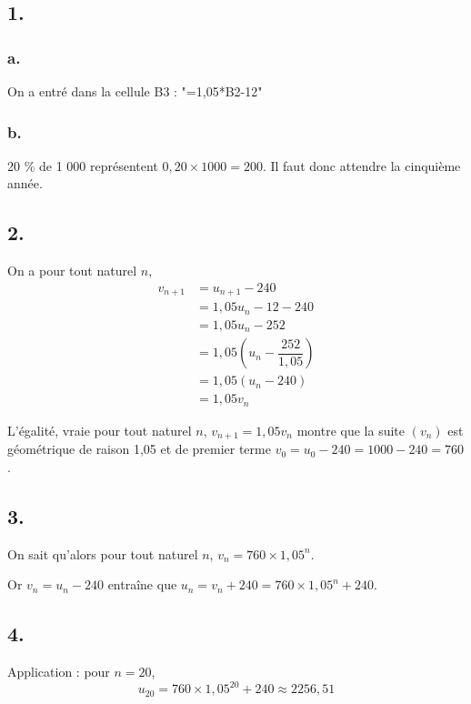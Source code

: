 \subsection*{1.}
	
	\subsubsection*{a.}
	
	On a entré dans la cellule B3 : "=1,05*B2-12"
	
	\subsubsection*{b.}
	
	20 \% de 1 000 représentent \(0,20 \times 1000 = 200\). Il faut donc attendre la cinquième année.
	

	\subsection*{2.}
	
	On a pour tout naturel \(n\),
\begin{align*}
			v_{n+1}& = u_{n+1} - 240\\
			& = 1,05u_n - 12 - 240 \\
			&= 1,05u_n - 252 \\
			&= 1,05(u_n - \dfrac{252}{1,05}) \\
			&= 1,05(u_n - 240) \\
			&= 1,05v_n
\end{align*}

	
	
	L'égalité, vraie pour tout naturel \(n\), \(v_{n+1} = 1,05v_n\) montre que la suite \((v_n)\) est géométrique de raison 1,05 et de premier terme \(v_0 = u_0 - 240 = 1000 - 240 = 760\).
	
	\subsection*{3.}
	
	On sait qu'alors pour tout naturel \(n\), \(v_n = 760 \times 1,05^n\).
	
	Or \(v_n = u_n - 240\) entraîne que \(u_n = v_n + 240 = 760 \times 1,05^n + 240\).
	
	\subsection*{4.}
	
	Application : pour \(n = 20\),
	\[
	u_{20} = 760 \times 1,05^{20} + 240 \approx 2256,51
	\]
